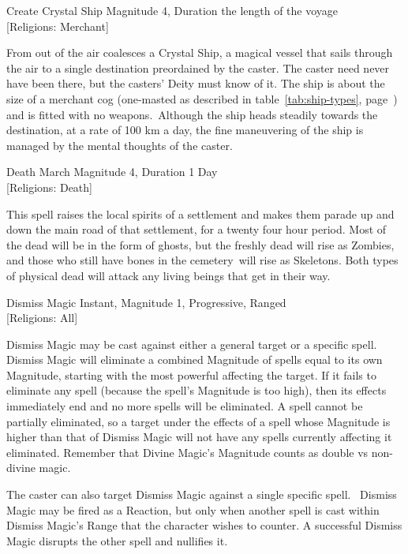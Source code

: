 \begin{rpg-spell}
{Create Crystal Ship}
{Magnitude 4, Duration the length of the voyage\\{[Religions: Merchant]}}

	From out of the air coalesces a Crystal Ship, a magical vessel that sails through the air to a single destination preordained by the caster. The caster need never have been there, but the casters’ Deity must know of it. The ship is about the size of a merchant cog (one-masted as described in table~\ref{tab:ship-types}, page~\pageref{tab:ship-types}) and is fitted with no weapons. Although the ship heads steadily towards the destination, at a rate of 100 km a day, the fine maneuvering of the ship is managed by the mental thoughts of the caster.
\end{rpg-spell}

\begin{rpg-spell}
{Death March}
{Magnitude 4, Duration 1 Day\\{[Religions: Death]}}

This spell raises the local spirits of a settlement and makes them parade up and down the main road of that settlement, for a twenty four hour period. Most of the dead will be in the form of ghosts, but the freshly dead will rise as Zombies, and those who still have bones in the cemetery will rise as Skeletons. Both types of physical dead will attack any living beings that get in their way. 
\end{rpg-spell}

\begin{rpg-spell}
{Dismiss Magic}
{Instant, Magnitude 1, Progressive, Ranged\\{[Religions: All]}}

Dismiss Magic may be cast against either a general target or a specific spell. Dismiss Magic will eliminate a combined Magnitude of spells equal to its own Magnitude, starting with the most powerful affecting the target. If it fails to eliminate any spell (because the spell’s Magnitude is too high), then its effects immediately end and no more spells will be eliminated. A spell cannot be partially eliminated, so a target under the effects of a spell whose Magnitude is higher than that of Dismiss Magic will not have any spells currently affecting it eliminated. Remember that Divine Magic's Magnitude counts as double vs non-divine magic.
	
The caster can also target Dismiss Magic against a single specific spell. 
Dismiss Magic may be fired as a Reaction, but only when another spell is cast within Dismiss Magic’s Range that the character wishes to counter. A successful Dismiss Magic disrupts the other spell and nullifies it. 
\end{rpg-spell}

